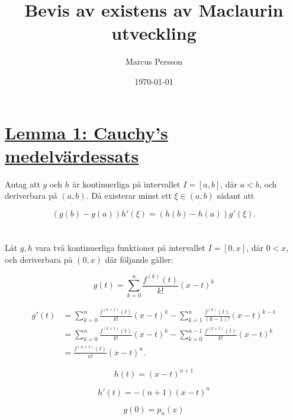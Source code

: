 \documentclass{article}
\title{Bevis av existens av Maclaurin utveckling}
\author{Marcus Persson}
\date{\today}
\begin{document}
\maketitle

\section*{\underline{Lemma 1: Cauchy's medelvärdessats}}

Antag att $g$ och $h$ är kontinuerliga på intervallet
$I=[a,b]$, där $a<b$, och deriverbara på $(a,b)$.
Då existerar minst ett $\xi \in (a,b)$ sådant att

\begin{equation*}
    (g(b)-g(a))h'(\xi)
    =
    (h(b)-h(a))g'(\xi).
\end{equation*}

\section*{}

Låt $g,h$ vara två kontinuerliga funktioner på intervallet $I=[0,x]$, där $0<x$, och deriverbara på $(0,x)$ där följande gäller:

\begin{equation}
    g(t) = \sum_{k=0}^{n}\frac{f^{(k)}(t)}{k!}(x-t)^k
\end{equation}

\begin{equation}
\begin{aligned}
g'(t)
&=
\sum_{k=0}^{n}\frac{f^{(k+1)}(t)}{k!}(x-t)^k
-
\sum_{k=1}^{n}\frac{f^{(k)}(t)}{(k-1)!}(x-t)^{k-1}\\
&=
\sum_{k=0}^{n}\frac{f^{(k+1)}(t)}{k!}(x-t)^k
-
\sum_{k=0}^{n-1}\frac{f^{(k+1)}(t)}{k!}(x-t)^k\\
&=
\frac{f^{(n+1)}(t)}{n!}(x-t)^n.
\end{aligned}
\end{equation}

\begin{equation}
    h(t) = (x-t)^{n+1}
\end{equation}

\begin{equation}
    h'(t) = -(n+1)(x-t)^n
\end{equation}

\begin{equation}
    g(0) = p_{n}(x)
\end{equation}
\end{document}
